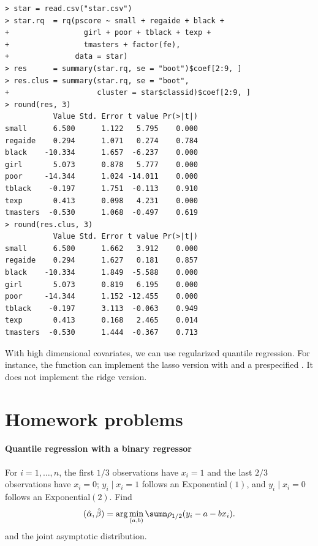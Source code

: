 \begin{lstlisting}
> star = read.csv("star.csv")
> star.rq  = rq(pscore ~ small + regaide + black + 
+                 girl + poor + tblack + texp + 
+                 tmasters + factor(fe),
+               data = star)
> res      = summary(star.rq, se = "boot")$coef[2:9, ]
> res.clus = summary(star.rq, se = "boot", 
+                    cluster = star$classid)$coef[2:9, ]
> round(res, 3)
           Value Std. Error t value Pr(>|t|)
small      6.500      1.122   5.795    0.000
regaide    0.294      1.071   0.274    0.784
black    -10.334      1.657  -6.237    0.000
girl       5.073      0.878   5.777    0.000
poor     -14.344      1.024 -14.011    0.000
tblack    -0.197      1.751  -0.113    0.910
texp       0.413      0.098   4.231    0.000
tmasters  -0.530      1.068  -0.497    0.619
> round(res.clus, 3)
           Value Std. Error t value Pr(>|t|)
small      6.500      1.662   3.912    0.000
regaide    0.294      1.627   0.181    0.857
black    -10.334      1.849  -5.588    0.000
girl       5.073      0.819   6.195    0.000
poor     -14.344      1.152 -12.455    0.000
tblack    -0.197      3.113  -0.063    0.949
texp       0.413      0.168   2.465    0.014
tmasters  -0.530      1.444  -0.367    0.713
\end{lstlisting}




With high dimensional covariates, we can use regularized quantile regression. For instance, the  function can implement the lasso version with  and a prespecified . It does not implement the ridge version. 






\section{Homework problems}
 
 

\paragraph{Quantile regression with a binary regressor}\label{hw22::qr-binaryx}

For $i=1,\ldots, n$, the first $1/3$ observations have $x_i=1$ and the last $2/3$ observations have $x_i=0$;
$y_i\mid x_i =1$ follows an Exponential$(1)$, and $y_i\mid x_i = 0 $ follows an Exponential$(2)$. Find
$$
(\hat{\alpha}, \hat{\beta})  = \arg\min_{(a,b)} \sumn \rho_{1/2}(y_i - a - b x_i).
$$
and the joint asymptotic distribution. 




